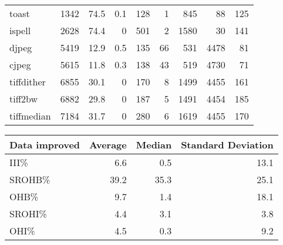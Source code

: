 \begin{tabular}{lrrrrrrrr}
 toast           &     1342 &     74.5 &    0.1 &  128 &    1 &    845 &    88 &   125 \\
 ispell          &     2628 &     74.4 &    0   &  501 &    2 &   1580 &    30 &   141 \\
 djpeg           &     5419 &     12.9 &    0.5 &  135 &   66 &    531 &  4478 &    81 \\
 cjpeg           &     5615 &     11.8 &    0.3 &  138 &   43 &    519 &  4730 &    71 \\
 tiffdither      &     6855 &     30.1 &    0   &  170 &    8 &   1499 &  4455 &   161 \\
 tiff2bw         &     6882 &     29.8 &    0   &  187 &    5 &   1491 &  4454 &   185 \\
 tiffmedian      &     7184 &     31.7 &    0   &  280 &    6 &   1619 &  4455 &   170 \\
\hline
\end{tabular}\begin{tabular}{lrrr}
\hline
 Data improved   &   Average &   Median &   Standard Deviation \\
\hline
 III\%            &       6.6 &      0.5 &                 13.1 \\
 SROHB\%          &      39.2 &     35.3 &                 25.1 \\
 OHB\%            &       9.7 &      1.4 &                 18.1 \\
 SROHI\%          &       4.4 &      3.1 &                  3.8 \\
 OHI\%            &       4.5 &      0.3 &                  9.2 \\
\hline
\end{tabular}